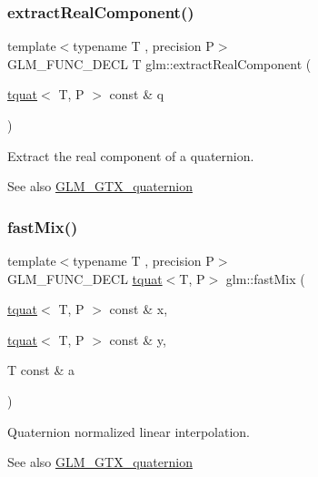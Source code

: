 \subsubsection{\texorpdfstring{extract\+Real\+Component()}{extractRealComponent()}}
{\footnotesize\ttfamily template$<$typename T , precision P$>$ \\
G\+L\+M\+\_\+\+F\+U\+N\+C\+\_\+\+D\+E\+CL T glm\+::extract\+Real\+Component (\begin{DoxyParamCaption}\item[{\hyperlink{structglm_1_1tquat}{tquat}$<$ T, P $>$ const \&}]{q }\end{DoxyParamCaption})}

Extract the real component of a quaternion.

\begin{DoxySeeAlso}{See also}
\hyperlink{group__gtx__quaternion}{G\+L\+M\+\_\+\+G\+T\+X\+\_\+quaternion} 
\end{DoxySeeAlso}
\mbox{\label{group__gtx__quaternion_gac11bf550f17d1da14423595a27575084}} 
\subsubsection{\texorpdfstring{fast\+Mix()}{fastMix()}}
{\footnotesize\ttfamily template$<$typename T , precision P$>$ \\
G\+L\+M\+\_\+\+F\+U\+N\+C\+\_\+\+D\+E\+CL \hyperlink{structglm_1_1tquat}{tquat}$<$T, P$>$ glm\+::fast\+Mix (\begin{DoxyParamCaption}\item[{\hyperlink{structglm_1_1tquat}{tquat}$<$ T, P $>$ const \&}]{x,  }\item[{\hyperlink{structglm_1_1tquat}{tquat}$<$ T, P $>$ const \&}]{y,  }\item[{T const \&}]{a }\end{DoxyParamCaption})}

Quaternion normalized linear interpolation.

\begin{DoxySeeAlso}{See also}
\hyperlink{group__gtx__quaternion}{G\+L\+M\+\_\+\+G\+T\+X\+\_\+quaternion} 
\end{DoxySeeAlso}
\mbox{\label{group__gtx__quaternion_ga56abae85b3669c866e91f3c57b298b9c}} 
